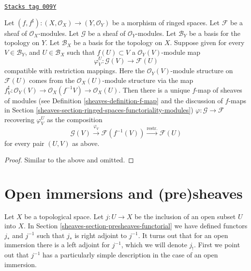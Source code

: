 \begin{lemma}
\label{sheaves-lemma-f-map-basis-above-and-below-modules}
\href{https://stacks.math.columbia.edu/tag/009Y}{\texttt{Stacks tag 009Y}}

Let $(f, f^\sharp) : (X, \mathcal{O}_X) \to (Y, \mathcal{O}_Y)$
be a morphism of ringed spaces.
Let $\mathcal{F}$ be a sheaf of $\mathcal{O}_X$-modules.
Let $\mathcal{G}$ be a sheaf of $\mathcal{O}_Y$-modules.
Let $\mathcal{B}_Y$ be a basis for the topology on $Y$.
Let $\mathcal{B}_X$ be a basis for the topology on $X$.
Suppose given for every $V \in \mathcal{B}_Y$, and
$U \in \mathcal{B}_X$ such that $f(U) \subset V$ a
$\mathcal{O}_Y(V)$-module map
$$
\varphi_V^U :
\mathcal{G}(V)
\longrightarrow
\mathcal{F}(U)
$$
compatible with restriction mappings. Here the
$\mathcal{O}_Y(V)$-module structure on $\mathcal{F}(U)$
comes from the $\mathcal{O}_X(U)$-module structure
via the map $f^\sharp_V : \mathcal{O}_Y(V)
\to \mathcal{O}_X(f^{-1}V) \to \mathcal{O}_X(U)$.
Then there is a unique $f$-map of sheaves of modules (see
Definition \ref{sheaves-definition-f-map} and the discussion
of $f$-maps in Section \ref{sheaves-section-ringed-spaces-functoriality-modules})
$\varphi : \mathcal{G} \to \mathcal{F}$
recovering $\varphi_V^U$ as the composition
$$
\mathcal{G}(V) \xrightarrow{\varphi_V}
\mathcal{F}(f^{-1}(V)) \xrightarrow{\text{restr.}}
\mathcal{F}(U)
$$
for every pair $(U, V)$ as above.
\end{lemma}

\begin{proof}
Similar to the above and omitted.
\end{proof}

\section{Open immersions and (pre)sheaves}
\label{sheaves-section-open-immersions}
Let $X$ be a topological space.
Let $j : U \to X$ be the inclusion of an open subset $U$ into $X$.
In Section \ref{sheaves-section-presheaves-functorial} we have defined
functors $j_*$ and $j^{-1}$ such that $j_*$ is right adjoint to
$j^{-1}$. It turns out that for an open immersion there is a left adjoint
for $j^{-1}$, which we will denote $j_!$. First we point out that
$j^{-1}$ has a particularly simple description in the case of
an open immersion.

